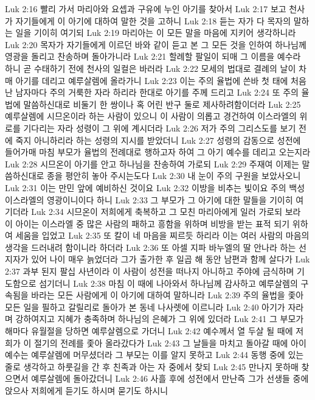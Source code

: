 Luk 2:16  빨리 가서 마리아와 요셉과 구유에 누인 아기를 찾아서
Luk 2:17  보고 천사가 자기들에게 이 아기에 대하여 말한 것을 고하니
Luk 2:18  듣는 자가 다 목자의 말하는 일을 기이히 여기되
Luk 2:19  마리아는 이 모든 말을 마음에 지키어 생각하니라
Luk 2:20  목자가 자기들에게 이르던 바와 같이 듣고 본 그 모든 것을 인하여 하나님께 영광을 돌리고 찬송하며 돌아가니라
Luk 2:21  할례할 팔일이 되매 그 이름을 예수라 하니 곧 수태하기 전에 천사의 일컬은 바러라
Luk 2:22  모세의 법대로 결례의 날이 차매 아기를 데리고 예루살렘에 올라가니
Luk 2:23  이는 주의 율법에 쓴바 첫 태에 처음 난 남자마다 주의 거룩한 자라 하리라 한대로 아기를 주께 드리고
Luk 2:24  또 주의 율법에 말씀하신대로 비둘기 한 쌍이나 혹 어린 반구 둘로 제사하려함이더라
Luk 2:25  예루살렘에 시므온이라 하는 사람이 있으니 이 사람이 의롭고 경건하여 이스라엘의 위로를 기다리는 자라 성령이 그 위에 계시더라
Luk 2:26  저가 주의 그리스도를 보기 전에 죽지 아니하리라 하는 성령의 지시를 받았더니
Luk 2:27  성령의 감동으로 성전에 들어가매 마침 부모가 율법의 전례대로 행하고자 하여 그 아기 예수를 데리고 오는지라
Luk 2:28  시므온이 아기를 안고 하나님을 찬송하여 가로되
Luk 2:29  주재여 이제는 말씀하신대로 종을 평안히 놓아 주시는도다
Luk 2:30  내 눈이 주의 구원을 보았사오니
Luk 2:31  이는 만민 앞에 예비하신 것이요
Luk 2:32  이방을 비추는 빛이요 주의 백성 이스라엘의 영광이니이다 하니
Luk 2:33  그 부모가 그 아기에 대한 말들을 기이히 여기더라
Luk 2:34  시므온이 저희에게 축복하고 그 모친 마리아에게 일러 가로되 보라 이 아이는 이스라엘 중 많은 사람의 패하고 흥함을 위하며 비방을 받는 표적 되기 위하여 세움을 입었고
Luk 2:35  또 칼이 네 마음을 찌르듯 하리라 이는 여러 사람의 마음의 생각을 드러내려 함이니라 하더라
Luk 2:36  또 아셀 지파 바누엘의 딸 안나라 하는 선지자가 있어 나이 매우 늙었더라 그가 출가한 후 일곱 해 동안 남편과 함께 살다가
Luk 2:37  과부 된지 팔십 사년이라 이 사람이 성전을 떠나지 아니하고 주야에 금식하며 기도함으로 섬기더니
Luk 2:38  마침 이 때에 나아와서 하나님께 감사하고 예루살렘의 구속됨을 바라는 모든 사람에게 이 아기에 대하여 말하니라
Luk 2:39  주의 율법을 좇아 모든 일을 필하고 갈릴리로 돌아가 본 동네 나사렛에 이르니라
Luk 2:40  아기가 자라며 강하여지고 지혜가 충족하며 하나님의 은혜가 그 위에 있더라
Luk 2:41  그 부모가 해마다 유월절을 당하면 예루살렘으로 가더니
Luk 2:42  예수께서 열 두살 될 때에 저희가 이 절기의 전례를 좇아 올라갔다가
Luk 2:43  그 날들을 마치고 돌아갈 때에 아이 예수는 예루살렘에 머무셨더라 그 부모는 이를 알지 못하고
Luk 2:44  동행 중에 있는 줄로 생각하고 하룻길을 간 후 친족과 아는 자 중에서 찾되
Luk 2:45  만나지 못하매 찾으면서 예루살렘에 돌아갔더니
Luk 2:46  사흘 후에 성전에서 만난즉 그가 선생들 중에 앉으사 저희에게 듣기도 하시며 묻기도 하시니

